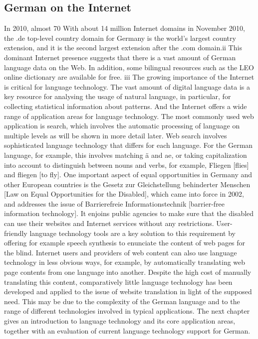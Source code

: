 \documentclass[]{../metanetpaper}
\begin{document}
	\subsection{German on the Internet}
In 2010, almost 70%
With about 14 million Internet domains in November 2010, the .de top-level country domain for Germany is the world’s largest country extension, and it is the second largest extension after the .com domain.ii This dominant Internet presence suggests that there is a vast amount of German language data on the Web. In addition, some bilingual resources such as the LEO online dictionary are available for free. iii
The growing importance of the Internet is critical for language technology. The vast amount of digital language data is a key resource for analysing the usage of natural language, in particular, for collecting statistical information about patterns. And the Internet offers a wide range of application areas for language technology. 
The most commonly used web application is search, which involves the automatic processing of language on multiple levels as will be shown in more detail later. Web search involves sophisticated language technology that differs for each language. For the German language, for example, this involves matching ä and ae, or taking capitalization into account to distinguish between nouns and verbs, for example, Fliegen [flies] and fliegen [to fly]. 
One important aspect of equal opportunities in Germany and other European countries is the Gesetz zur Gleichstellung behinderter Menschen [Law on Equal Opportunities for the Disabled], which came into force in 2002, and addresses the issue of Barrierefreie Informationstechnik [barrier-free information technology]. It enjoins public agencies to make sure that the disabled can use their websites and Internet services without any restrictions. User-friendly language technology tools are a key solution to this requirement by offering for example speech synthesis to enunciate the content of web pages for the blind.
Internet users and providers of web content can also use language technology in less obvious ways, for example, by automatically translating web page contents from one language into another. Despite the high cost of manually translating this content, comparatively little language technology has been developed and applied to the issue of website translation in light of the supposed need. This may be due to the complexity of the German language and to the range of different technologies involved in typical applications. 
The next chapter gives an introduction to language technology and its core application areas, together with an evaluation of current language technology support for German. 
	
\end{document}
